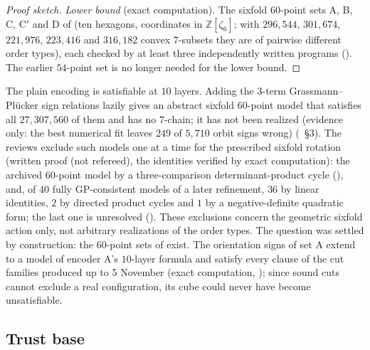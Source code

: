 \begin{proof}[Proof sketch]
\emph{Lower bound} (exact computation). The sixfold $60$-point sets A, B, C, C$'$ and D of  (ten
hexagons, coordinates in $\mathbb{Z}[\zeta_6]$; with $296{,}544$, $301{,}674$, $221{,}976$, $223{,}416$ and $316{,}182$
convex $7$-subsets they are of pairwise different order types), each checked by at least three independently written
programs (). The earlier $54$-point set  is no longer needed for the lower bound.
\end{proof}

\begin{remark}\label{k8:gap}
The plain encoding is satisfiable at $10$ layers. Adding the $3$-term Grassmann--Pl\"ucker sign relations lazily gives an
abstract sixfold $60$-point model that satisfies all $27{,}307{,}560$ of them and has no $7$-chain; it has not been
realized (evidence only: the best numerical fit leaves $249$ of $5{,}710$ orbit signs wrong) (~\S3). The reviews exclude such models one at a time for the prescribed sixfold rotation (written proof
(not refereed), the identities verified by exact computation): the archived $60$-point model by a three-comparison
determinant-product cycle (), and, of $40$ fully GP-consistent models of a later refinement, $36$ by
linear identities, $2$ by directed product cycles and $1$ by a negative-definite quadratic form; the last one is
unresolved (). These exclusions concern
the geometric sixfold action only, not arbitrary realizations of the order types. The question was settled by
construction: the $60$-point sets of  exist. The orientation signs of set A extend to a model of encoder A's
$10$-layer formula and satisfy every clause of the cut families produced up to 5 November (exact computation,
); since sound cuts cannot exclude a real configuration, its cube could never have become unsatisfiable.
\end{remark}

\subsection{Trust base}\label{k8:sec:trust}

